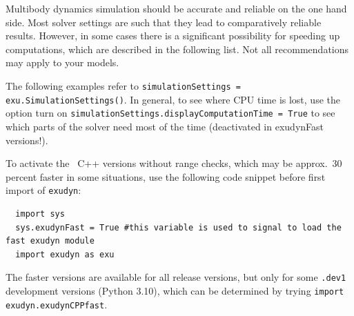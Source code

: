 \label{secSpeedUp}
%
Multibody dynamics simulation should be accurate and reliable on the one hand side. Most solver settings are such that they lead to comparatively reliable results.
However, in some cases there is a significant possibility for speeding up computations, which are described in the following list. Not all recommendations may apply to your models.

The following examples refer to \texttt{simulationSettings = exu.SimulationSettings()}.
In general, to see where CPU time is lost, use the option turn on \texttt{simulationSettings.displayComputationTime = True} to see which parts of the solver need most of the time (deactivated in exudynFast versions!).

To activate the \codeName\ C++ versions without range checks, which may be approx.\ 30 percent faster in some situations, use the following code snippet before first import of \texttt{exudyn}:
\pythonstyle\begin{lstlisting}
  import sys
  sys.exudynFast = True #this variable is used to signal to load the fast exudyn module
  import exudyn as exu
\end{lstlisting}
The faster versions are available for all release versions, but only for some \texttt{.dev1} development versions (Python 3.10), which can be determined by trying \texttt{import exudyn.exudynCPPfast}.

